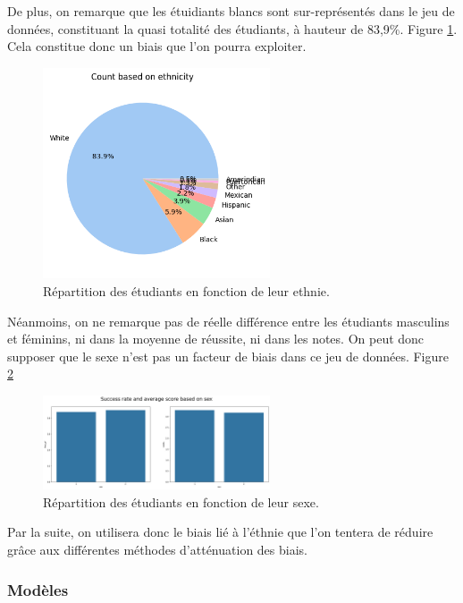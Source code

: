 \documentclass[12pt, letterpaper]{article}
\begin{document}
De plus, on remarque que les étuidiants blancs sont sur-représentés dans le jeu de données, constituant la quasi totalité des étudiants, à hauteur de 83,9\%. Figure \ref{fig:count}. Cela constitue donc un biais que l'on pourra exploiter.

\begin{figure}
    \centering
    \includegraphics[width=0.6\textwidth]{count_race}
    \caption{Répartition des étudiants en fonction de leur ethnie.}
    \label{fig:count}
\end{figure}

Néanmoins, on ne remarque pas de réelle différence entre les étudiants masculins et féminins, ni dans la moyenne de réussite, ni dans les notes. On peut donc supposer que le sexe n'est pas un facteur de biais dans ce jeu de données. Figure \ref{fig:success_sex}

\begin{figure}
    \centering
    \includegraphics[width=0.6\textwidth]{success_sex}
    \caption{Répartition des étudiants en fonction de leur sexe.}
    \label{fig:success_sex}
\end{figure}

Par la suite, on utilisera donc le biais lié à l'éthnie que l'on tentera de réduire grâce aux différentes méthodes d'atténuation des biais.

\subsubsection{Modèles}
\end{document}
